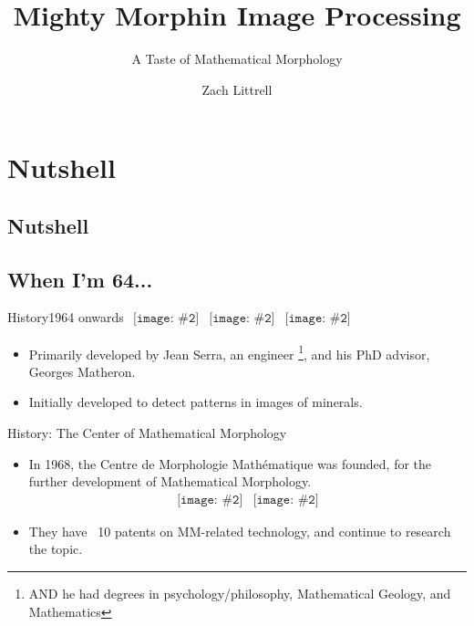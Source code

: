 \documentclass{beamer}
\title[A Taste of Mathematical Morphology]
      {Mighty Morphin Image Processing}
\subtitle{A Taste of Mathematical Morphology}
\author{Zach Littrell}
\institute{McDaniel College}
\newcommand{\pic}[2]{
     \begin{array}{l}
      \texttt{[image: \#2]}
      \end{array}
}
\begin{document}
\begin{frame}
  \titlepage
\end{frame}
\section{Nutshell}
\subsection{Nutshell}

\subsection{When I'm 64...}
\begin{frame}{History}{1964 onwards}
$\pic{width=100pt}{./images/matheron.jpg}
\pic{width=75pt}{./images/serra.jpg}
\pic{width=100pt}{images/petrograph.png}$

\begin{itemize} 
  \item Primarily developed by Jean Serra, an engineer
        \footnote{AND he had degrees in psychology/philosophy,
                  Mathematical Geology, and Mathematics},
        and his PhD advisor, Georges Matheron.
  \item Initially developed to detect patterns in images of minerals.
\end{itemize}
\end{frame}

\begin{frame}{History: The Center of Mathematical Morphology}
  \begin{itemize}
    \item In 1968, the Centre de Morphologie Math\'{e}matique 
          was founded, for the further development of Mathematical Morphology.
          $$\pic{width=100pt}{images/cmm.png}
            \pic{width=100pt}{images/directions.png}$$
          \item They have ~10 patents on MM-related technology,
                and continue to research the topic.
  \end{itemize}
\end{frame}

\end{document}
